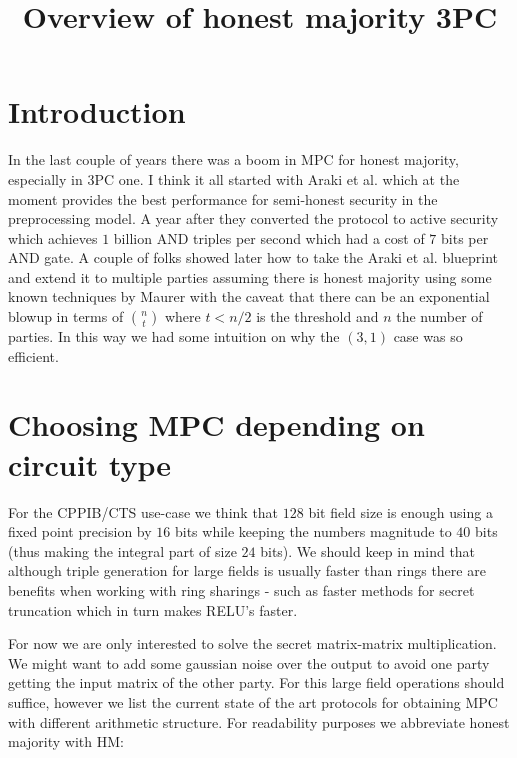 \documentclass[11pt]{article}
\begin{document}
%

\title{Overview of honest majority 3PC}

\maketitle

\section{Introduction}


In the last couple of years there was a boom in MPC for honest majority,
especially in 3PC one. I think it all started with Araki et al.
\cite{CCS:AFLNO16} which at the moment provides the best performance for
semi-honest security in the preprocessing model. A year after they converted
the protocol to active security which achieves $1$ billion AND triples per
second \cite{SP:ABFLLN17} which had a cost of $7$ bits per AND gate. A couple
of folks showed later how to take the Araki et al. \cite{CCS:AFLNO16}
blueprint and extend it to multiple parties assuming there is honest majority
\cite{SCN:KRSW18} using some known techniques by Maurer \cite{SCN:Maurer02}
with the caveat that there can be an exponential blowup in terms of $n
\choose t$ where $t<n/2$ is the threshold and $n$ the number of parties. In
this way we had some intuition on why the $(3,1)$ case was so efficient.

\section{Choosing MPC depending on circuit type} For the CPPIB/CTS use-case
we think that $128$ bit field size is enough using a fixed point precision by
$16$ bits while keeping the numbers magnitude to $40$ bits (thus making the
integral part of size $24$ bits). We should keep in mind that although triple
generation for large fields is usually faster than rings there are benefits
when working with ring sharings - such as faster methods for secret
truncation which in turn makes RELU's faster.

For now we are only interested to solve the secret matrix-matrix
multiplication. We might want to add some gaussian noise over the output to
avoid one party getting the input matrix of the other party. For this large
field operations should suffice, however we list the current state of the art
protocols for obtaining MPC with different arithmetic structure. For
readability purposes we abbreviate honest majority with HM:
\end{document}
